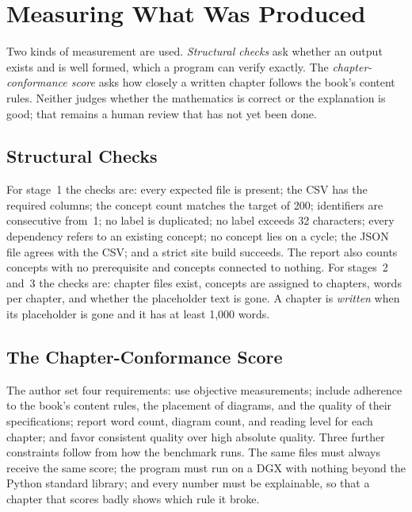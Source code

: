 \documentclass[11pt]{article}
\begin{document}
\section{Measuring What Was Produced}
\label{sec:measurement}

Two kinds of measurement are used. \textit{Structural checks} ask whether an output exists and is well formed, which a program can verify exactly. The \textit{chapter-conformance score} asks how closely a written chapter follows the book's content rules. Neither judges whether the mathematics is correct or the explanation is good; that remains a human review that has not yet been done.

\subsection{Structural Checks}

For stage~1 the checks are: every expected file is present; the CSV has the required columns; the concept count matches the target of 200; identifiers are consecutive from~1; no label is duplicated; no label exceeds 32 characters; every dependency refers to an existing concept; no concept lies on a cycle; the JSON file agrees with the CSV; and a strict site build succeeds. The report also counts concepts with no prerequisite and concepts connected to nothing. For stages~2 and~3 the checks are: chapter files exist, concepts are assigned to chapters, words per chapter, and whether the placeholder text is gone. A chapter is \textit{written} when its placeholder is gone and it has at least 1,000 words.

\subsection{The Chapter-Conformance Score}

The author set four requirements: use objective measurements; include adherence to the book's content rules, the placement of diagrams, and the quality of their specifications; report word count, diagram count, and reading level for each chapter; and favor consistent quality over high absolute quality. Three further constraints follow from how the benchmark runs. The same files must always receive the same score; the program must run on a DGX with nothing beyond the Python standard library; and every number must be explainable, so that a chapter that scores badly shows which rule it broke.
\end{document}
